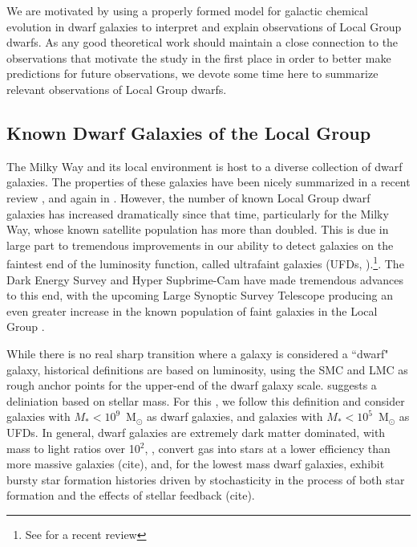 We are motivated by using a properly formed model for galactic chemical evolution in dwarf galaxies to interpret and explain observations of Local Group dwarfs. As any good theoretical work should maintain a close connection to the observations that motivate the study in the first place in order to better make predictions for future observations, we devote some time here to summarize relevant observations of Local Group dwarfs.

\subsection{Known Dwarf Galaxies of the Local Group}
\label{intro:sec:dwarf galaxies}

The Milky Way and its local environment is host to a diverse collection of dwarf galaxies. The properties of these galaxies have been nicely summarized in a recent review \citep{Tolstoy2009}, and again in \cite{McConnachie2012}. However, the number of known Local Group dwarf galaxies has increased dramatically since that time, particularly for the Milky Way, whose known satellite population has more than doubled. This is due in large part to tremendous improvements in our ability to detect galaxies on the faintest end of the luminosity function, called ultrafaint galaxies (UFDs, \cite{Willman2005}).\footnote{See \cite{Simon2019} for a recent review}. The Dark Energy Survey \citep[e.g.][]{Drlica-Wagner2015} and Hyper Supbrime-Cam \citep[e.g.][]{Greco2018} have made tremendous advances to this end, with the upcoming Large Synoptic Survey Telescope producing an even greater increase in the known population of faint galaxies in the Local Group \citep{Haynes2019,Weisz2019}.

While there is no real sharp transition where a galaxy is considered a ``dwarf" galaxy, historical definitions are based on luminosity, using the SMC and LMC as rough anchor points for the upper-end of the dwarf galaxy scale. \cite{Bullock2017} suggests a deliniation based on stellar mass. For this \dissertation, we follow this definition and consider galaxies with $M_* < 10^9$~M$_{\odot}$ as dwarf galaxies, and galaxies with $M_* < 10^5$~M$_{\odot}$ as UFDs. In general, dwarf galaxies are extremely dark matter dominated, with mass to light ratios over 10$^2$, \citep{SimonGeha2007,Strigari2008,Wolf2010}, convert gas into stars at a lower efficiency than more massive galaxies (cite), and, for the lowest mass dwarf galaxies, exhibit bursty star formation histories driven by stochasticity in the process of both star formation and the effects of stellar feedback (cite).


